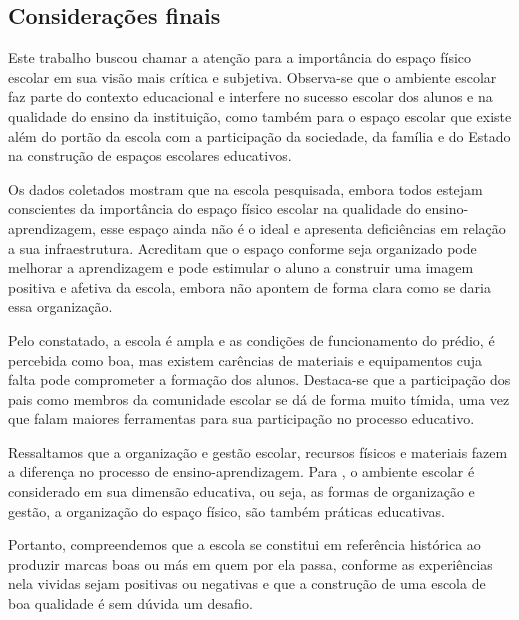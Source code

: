 \begin{refsection}
    \section{Considerações finais}

    Este trabalho buscou chamar a atenção para a importância do espaço físico escolar em sua visão mais crítica e subjetiva. Observa-se que o ambiente escolar faz parte do contexto educacional e interfere no sucesso escolar dos alunos e na qualidade do ensino da instituição, como também para o espaço escolar que existe além do portão da escola com a participação da sociedade, da família e do Estado na construção de espaços escolares educativos.  

    Os dados coletados mostram que na escola pesquisada, embora todos estejam conscientes da importância do espaço físico escolar na qualidade do ensino-aprendizagem, esse espaço ainda não é o ideal e apresenta deficiências em relação a sua infraestrutura. Acreditam que o espaço conforme seja organizado pode melhorar a aprendizagem e pode estimular o aluno a construir uma imagem positiva e afetiva da escola, embora não apontem de forma clara como se daria essa organização.  

    Pelo constatado, a escola é ampla e as condições de funcionamento do prédio, é percebida como boa, mas existem carências de materiais e equipamentos cuja falta pode comprometer a formação dos alunos. Destaca-se que a participação dos pais como membros da comunidade escolar se dá de forma muito tímida, uma vez que falam maiores ferramentas para sua participação no processo educativo. 

    Ressaltamos que a organização e gestão escolar, recursos físicos e materiais fazem a diferença no processo de ensino-aprendizagem. Para \textcite{LIBÂNEO2015Organização}, o ambiente escolar é considerado em sua dimensão educativa, ou seja, as formas de organização e gestão, a organização do espaço físico, são também práticas educativas. 

    Portanto, compreendemos que a escola se constitui em referência histórica ao produzir marcas boas ou más em quem por ela passa, conforme as experiências nela vividas sejam positivas ou negativas e que a construção de uma escola de boa qualidade é sem dúvida um desafio. 

    \nocite{PPPEscEstTiradentes}
    \nocite{DÓREA2013Arquitetura}
    \nocite{PARO2016Gestão}

    \printbibliography[heading=subbibliography,notcategory=fullcited]

    \label{chap:imprtancia-espaco-eend}

\end{refsection}
